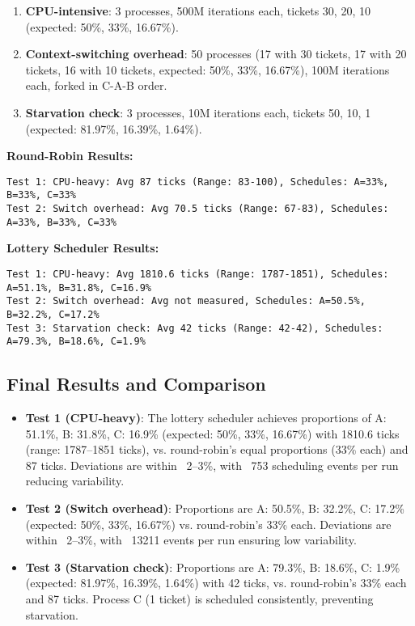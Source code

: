 \documentclass[12pt]{article}
\begin{document}
\begin{enumerate}[label=\arabic*.]
  \item \textbf{CPU-intensive}: 3 processes, 500M iterations each, tickets 30, 20, 10 (expected: 50\%, 33\%, 16.67\%).
  \item \textbf{Context-switching overhead}: 50 processes (17 with 30 tickets, 17 with 20 tickets, 16 with 10 tickets, expected: 50\%, 33\%, 16.67\%), 100M iterations each, forked in C-A-B order.
  \item \textbf{Starvation check}: 3 processes, 10M iterations each, tickets 50, 10, 1 (expected: 81.97\%, 16.39\%, 1.64\%).
\end{enumerate}

\textbf{Round-Robin Results:}
\begin{lstlisting}
Test 1: CPU-heavy: Avg 87 ticks (Range: 83-100), Schedules: A=33%, B=33%, C=33%
Test 2: Switch overhead: Avg 70.5 ticks (Range: 67-83), Schedules: A=33%, B=33%, C=33%
\end{lstlisting}

\textbf{Lottery Scheduler Results:}
\begin{lstlisting}
Test 1: CPU-heavy: Avg 1810.6 ticks (Range: 1787-1851), Schedules: A=51.1%, B=31.8%, C=16.9%
Test 2: Switch overhead: Avg not measured, Schedules: A=50.5%, B=32.2%, C=17.2%
Test 3: Starvation check: Avg 42 ticks (Range: 42-42), Schedules: A=79.3%, B=18.6%, C=1.9%
\end{lstlisting}

\subsection{Final Results and Comparison}
\label{subsec:lottery-results}

\begin{itemize}
  \item \textbf{Test 1 (CPU-heavy)}: The lottery scheduler achieves proportions of A: 51.1\%, B: 31.8\%, C: 16.9\% (expected: 50\%, 33\%, 16.67\%) with 1810.6 ticks (range: 1787–1851 ticks), vs. round-robin’s equal proportions (33\% each) and 87 ticks. Deviations are within ~2–3\%, with ~753 scheduling events per run reducing variability.
  \item \textbf{Test 2 (Switch overhead)}: Proportions are A: 50.5\%, B: 32.2\%, C: 17.2\% (expected: 50\%, 33\%, 16.67\%) vs. round-robin’s 33\% each. Deviations are within ~2–3\%, with ~13211 events per run ensuring low variability.
  \item \textbf{Test 3 (Starvation check)}: Proportions are A: 79.3\%, B: 18.6\%, C: 1.9\% (expected: 81.97\%, 16.39\%, 1.64\%) with 42 ticks, vs. round-robin’s 33\% each and 87 ticks. Process C (1 ticket) is scheduled consistently, preventing starvation.
\end{itemize}
\end{document}
